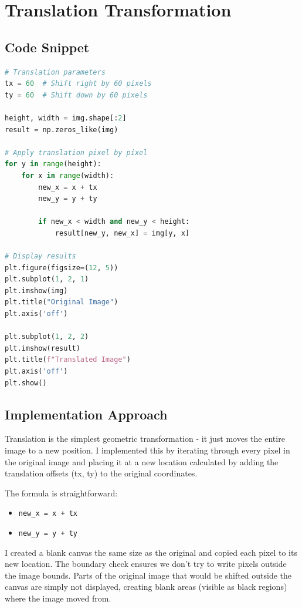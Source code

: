 \documentclass[12pt,a4paper]{report}
\begin{document}
\section{Translation Transformation}

\subsection{Code Snippet}
\begin{lstlisting}[language=Python, caption={Manual Translation Implementation}]
# Translation parameters
tx = 60  # Shift right by 60 pixels
ty = 60  # Shift down by 60 pixels

height, width = img.shape[:2]
result = np.zeros_like(img)

# Apply translation pixel by pixel
for y in range(height):
    for x in range(width):
        new_x = x + tx
        new_y = y + ty

        if new_x < width and new_y < height:
            result[new_y, new_x] = img[y, x]

# Display results
plt.figure(figsize=(12, 5))
plt.subplot(1, 2, 1)
plt.imshow(img)
plt.title("Original Image")
plt.axis('off')

plt.subplot(1, 2, 2)
plt.imshow(result)
plt.title(f"Translated Image")
plt.axis('off')
plt.show()
\end{lstlisting}

\subsection{Implementation Approach}
Translation is the simplest geometric transformation - it just moves the entire image to a new position. I implemented this by iterating through every pixel in the original image and placing it at a new location calculated by adding the translation offsets (tx, ty) to the original coordinates.

The formula is straightforward:
\begin{itemize}
    \item \texttt{new\_x = x + tx}
    \item \texttt{new\_y = y + ty}
\end{itemize}

I created a blank canvas the same size as the original and copied each pixel to its new location. The boundary check ensures we don't try to write pixels outside the image bounds. Parts of the original image that would be shifted outside the canvas are simply not displayed, creating blank areas (visible as black regions) where the image moved from.
\end{document}
